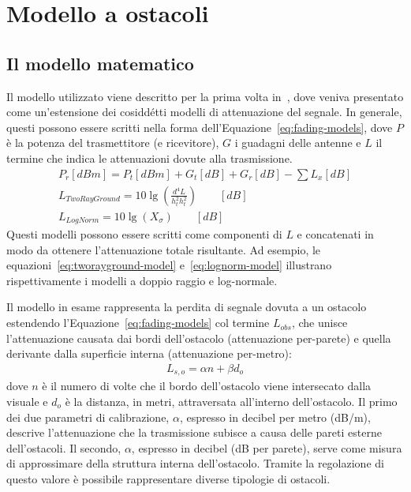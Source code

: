 

\chapter{Modello a ostacoli}\label{chap:modello-a-ostacoli}
%
\section{Il modello matematico}\label{sec:il-modello-matematico}
Il modello utilizzato viene descritto per la prima volta in~\cite{5720204}, dove veniva presentato
come un'estensione dei cosiddétti modelli di attenuazione del segnale.
In generale, questi possono essere scritti nella forma dell'Equazione~\ref{eq:fading-models}, dove $P$ è la potenza del trasmettitore (e ricevitore),
$G$ i guadagni delle antenne e $L$ il termine che indica le attenuazioni dovute alla trasmissione.
%
\begin{gather}
	P_r[dBm] = P_t[dBm] + G_t[dB] + G_r[dB] - \sum L_x[dB] 														\label{eq:fading-models} \\
	L_{TwoRayGround} = 10 \lg \left( \frac{d^4 L}{h^2_t h^2_t} \right)	\qquad [dB]		\label{eq:tworayground-model} \\
	L_{LogNorm} = 10 \lg \left( X_\sigma \right)	\qquad [dB]													\label{eq:lognorm-model}
\end{gather}
%
Questi modelli possono essere scritti come componenti di $L$ e concatenati in modo da ottenere l'attenuazione totale risultante.
Ad esempio, le equazioni~\ref{eq:tworayground-model} e~\ref{eq:lognorm-model} illustrano rispettivamente i modelli a doppio raggio e log-normale.

Il modello in esame rappresenta la perdita di segnale dovuta a un ostacolo estendendo l'Equazione~\ref{eq:fading-models}
col termine $L_{obs}$, che unisce l'attenuazione causata dai bordi dell'ostacolo (attenuazione per-parete)
e quella derivante dalla superficie interna (attenuazione per-metro):
%
\begin{gather}\label{eq:osbtacle-model}
	L_{s,o} = \alpha n + \beta d_o
\end{gather}
dove $n$ è il numero di volte che il bordo dell'ostacolo viene intersecato dalla visuale e $d_o$ è la distanza, in metri, attraversata all'interno dell'ostacolo.
Il primo dei due parametri di calibrazione, $\alpha$, espresso in decibel per metro (dB/m), descrive l'attenuazione
che la trasmissione subisce a causa delle pareti esterne dell'ostacoli.
Il secondo, $\alpha$, espresso in decibel (dB per parete), serve come misura di approssimare della struttura interna dell'ostacolo.
Tramite la regolazione di questo valore è possibile rappresentare diverse tipologie di ostacoli.

